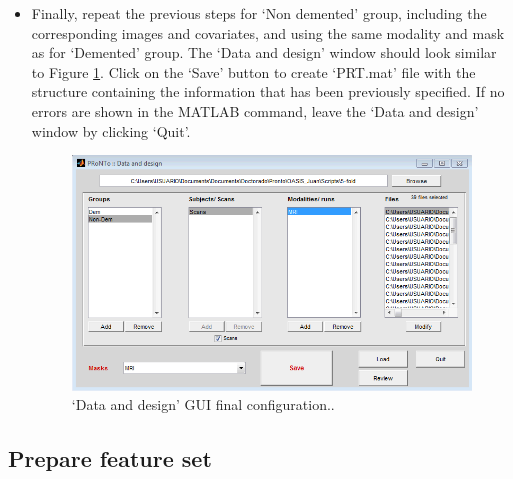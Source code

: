 \begin{itemize}
	\item Finally, repeat the previous steps for `Non demented' group, including the corresponding images and covariates, and using the same modality and mask as for `Demented' group. The `Data and design' window should look similar to Figure \ref{fig:data_and_design}. Click on the `Save' button to create `PRT.mat' file with the structure containing the information that has been previously specified. If no errors are shown in the MATLAB command, leave the `Data and design' window by clicking `Quit'.

\begin{figure}[!h]
	\centering
		\includegraphics[scale=0.7]{images/Tutorial/confounds/Data_and_design.png}
	\caption{`Data and design' GUI final configuration..}
	\label{fig:data_and_design}
\end{figure}

\end{itemize}


\subsection{Prepare feature set}

